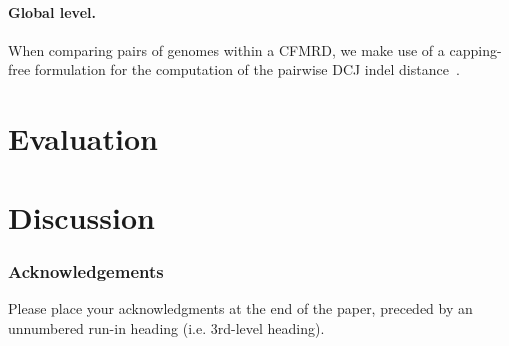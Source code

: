 \documentclass[runningheads]{llncs}
\begin{document}
\paragraph{Global level.}

When comparing pairs of genomes within a CFMRD, we make use of a capping-free formulation for the computation of the pairwise DCJ indel distance~\cite{BOH-2023}.






\section{Evaluation}
\section{Discussion}



\subsubsection{Acknowledgements} Please place your acknowledgments at
the end of the paper, preceded by an unnumbered run-in heading (i.e.
3rd-level heading).

%
%
%


\end{document}
